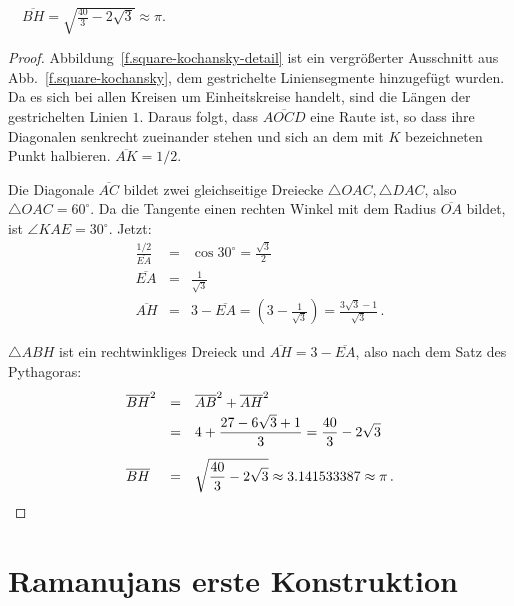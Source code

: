 \begin{theorem}
$\quad\overline{BH}=\sqrt{\displaystyle\frac{40}{3}-2\sqrt{3}}\approx \pi$.
\end{theorem}
\begin{proof}
Abbildung~\ref{f.square-kochansky-detail} ist ein vergrößerter Ausschnitt aus Abb.~\ref{f.square-kochansky}, dem gestrichelte Liniensegmente hinzugefügt wurden. Da es sich bei allen Kreisen um Einheitskreise handelt, sind die Längen der gestrichelten Linien $1$. Daraus folgt, dass $\overline{AOCD}$ eine Raute ist, so dass ihre Diagonalen senkrecht zueinander stehen und sich an dem mit $K$ bezeichneten Punkt halbieren. $\overline{AK}=1/2$.

Die Diagonale $\overline{AC}$ bildet zwei gleichseitige Dreiecke $\triangle OAC, \triangle DAC$, also $\triangle OAC=60^\circ$. Da die Tangente einen rechten Winkel mit dem Radius $\overline{OA}$ bildet, ist $\angle KAE=30^\circ$. Jetzt:
\begin{displaymath}
\renewcommand{\arraystretch}{1.5}
\begin{array}{lcl}
\displaystyle\frac{1/2}{\overline{EA}}&=&
\cos 30^\circ=\displaystyle\frac{\sqrt{3}}{2}\\
\overline{EA}&=&\displaystyle\frac{1}{\sqrt{3}}\\
\overline{AH}&=&3-\overline{EA}=\left(3-\displaystyle\frac{1}{\sqrt{3}}\right)
=\displaystyle\frac{3\sqrt{3}-1}{\sqrt{3}}\,.
\end{array}
\end{displaymath}

$\triangle ABH$ ist ein rechtwinkliges Dreieck und $\overline{AH}=3-\overline{EA}$, also nach dem Satz des Pythagoras:
\begin{displaymath}
\renewcommand{\arraystretch}{1.5}
\begin{array}{lcl}
\overline{BH}^2&=&\overline{AB}^2+\overline{AH}^2\\
&=&4+\displaystyle\frac{27 -6\sqrt{3}+1}{3}=\frac{40}{3}-2\sqrt{3}\\
\overline{BH}&=&\rule{0pt}{25pt}\sqrt{\displaystyle\frac{40}{3}-2\sqrt{3}}\approx 3.141533387\approx \pi\,.
\end{array}
\end{displaymath}
\end{proof}


\section{Ramanujans erste Konstruktion}\label{s.square-ramanujan-first}


